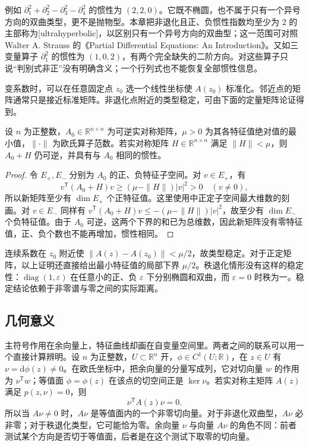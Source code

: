 \ProseParagraphBreak

例如 \(\partial_1^2+\partial_2^2-\partial_3^2-\partial_4^2\) 的惯性为 \((2,2,0)\)。它既不椭圆，也不属于只有一个异号方向的双曲类型，更不是抛物型。本章把非退化且正、负惯性指数均至少为 \(2\) 的主部称为[ultrahyperbolic]，以区别只有一个异号方向的双曲型；这一范围可对照 Walter A. Strauss 的《Partial Differential Equations: An Introduction》\cite[Section 1.6, pp. 30--31]{Strauss2008Partial}。又如三变量算子 \(\partial_1^2\) 的惯性为 \((1,0,2)\)，有两个完全缺失的二阶方向。对这些算子只说“判别式非正”没有明确含义；一个行列式也不能恢复全部惯性信息。

\ProseParagraphBreak

变系数时，可以在任意固定点 \(z_0\) 选一个线性坐标使 \(A(z_0)\) 标准化。邻近点的矩阵通常只是接近标准矩阵。非退化点附近的类型稳定，可由下面的定量矩阵论证得到。

\begin{lemma}[惯性的小扰动稳定性]\label{b2:lem:08-inertia-perturbation}
设 \(n\) 为正整数，\(A_0\in\mathbb R^{n\times n}\) 为可逆实对称矩阵，\(\mu>0\) 为其各特征值绝对值的最小值，\(\|\cdot\|\) 为欧氏算子范数。若实对称矩阵 \(H\in\mathbb R^{n\times n}\) 满足 \(\|H\|<\mu\)，则 \(A_0+H\) 仍可逆，并具有与 \(A_0\) 相同的惯性。
\end{lemma}
\begin{proof}
令 \(E_+,E_-\) 分别为 \(A_0\) 的正、负特征子空间。对 \(v\in E_+\)，有
\[
 v^{\mathsf T}(A_0+H)v\geq(\mu-\|H\|)|v|^2>0\quad(v\ne0),
\]
所以新矩阵至少有 \(\dim E_+\) 个正特征值。这里使用中正定子空间最大维数的刻画。对 \(v\in E_-\) 同样有 \(v^{\mathsf T}(A_0+H)v\leq-(\mu-\|H\|)|v|^2\)，故至少有 \(\dim E_-\) 个负特征值。由于 \(A_0\) 可逆，这两个下界的和已为总维数，因此新矩阵没有零特征值，正、负个数也不能再增加，惯性相同。
\end{proof}

连续系数在 \(z_0\) 附近使 \(\|A(z)-A(z_0)\|<\mu/2\)，故类型稳定。对于正定矩阵，以上证明还直接给出最小特征值的局部下界 \(\mu/2\)。秩退化情形没有这样的稳定性：\(\operatorname{diag}(1,\varepsilon)\) 在任意小的正、负 \(\varepsilon\) 下分别椭圆和双曲，而 \(\varepsilon=0\) 时秩为一。稳定结论依赖于非零谱与零之间的实际距离。

\subsection{几何意义}
\label{b2:subsec:080304}

主符号作用在余向量上，特征曲线却画在自变量空间里。两者之间的联系可以用一个直接计算辨明。设 \(n\) 为正整数，\(U\subset\mathbb R^n\) 开，\(\phi\in C^1(U;\mathbb R)\)，在 \(z\in U\) 有 \(\nu=\mathrm d\phi(z)\ne0\)。在欧氏坐标中，把余向量的分量写成列，它对切向量 \(w\) 的作用为 \(\nu^{\mathsf T}w\)；等值面 \(\phi=\phi(z)\) 在该点的切空间正是 \(\ker\nu\)。若实对称主矩阵 \(A(z)\) 满足 \(p(z,\nu)=0\)，则
\[
 \nu^{\mathsf T}A(z)\nu=0.
\]
所以当 \(A\nu\ne0\) 时，\(A\nu\) 是等值面内的一个非零切向量。对于非退化双曲型，\(A\nu\) 必非零；对于秩退化类型，它可能恰为零。余向量 \(\nu\) 与向量 \(A\nu\) 的角色不同：前者测试某个方向是否切于等值面，后者是在这个测试下取零的切向量。

